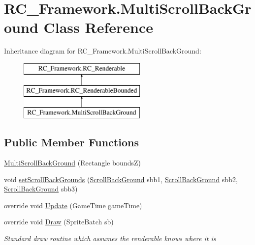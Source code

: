 \hypertarget{class_r_c___framework_1_1_multi_scroll_back_ground}{}\section{R\+C\+\_\+\+Framework.\+Multi\+Scroll\+Back\+Ground Class Reference}
\label{class_r_c___framework_1_1_multi_scroll_back_ground}
Inheritance diagram for R\+C\+\_\+\+Framework.\+Multi\+Scroll\+Back\+Ground\+:\begin{figure}[H]
\begin{center}
\leavevmode
\includegraphics[height=3.000000cm]{class_r_c___framework_1_1_multi_scroll_back_ground}
\end{center}
\end{figure}
\subsection*{Public Member Functions}
\begin{DoxyCompactItemize}
\item 
\mbox{\hyperlink{class_r_c___framework_1_1_multi_scroll_back_ground_a080400ff40d4fb293197930c6a76560e}{Multi\+Scroll\+Back\+Ground}} (Rectangle boundsZ)
\item 
void \mbox{\hyperlink{class_r_c___framework_1_1_multi_scroll_back_ground_a480037cbf0141cd66686b3692f1af978}{set\+Scroll\+Back\+Grounds}} (\mbox{\hyperlink{class_r_c___framework_1_1_scroll_back_ground}{Scroll\+Back\+Ground}} sbb1, \mbox{\hyperlink{class_r_c___framework_1_1_scroll_back_ground}{Scroll\+Back\+Ground}} sbb2, \mbox{\hyperlink{class_r_c___framework_1_1_scroll_back_ground}{Scroll\+Back\+Ground}} sbb3)
\item 
override void \mbox{\hyperlink{class_r_c___framework_1_1_multi_scroll_back_ground_aed0cdef9bd5f161cde89af98dcf63e24}{Update}} (Game\+Time game\+Time)
\item 
override void \mbox{\hyperlink{class_r_c___framework_1_1_multi_scroll_back_ground_ac59e7e1e7a2e1ccfc364883b98765f00}{Draw}} (Sprite\+Batch sb)
\begin{DoxyCompactList}\small\item\em Standard draw routine which assumes the renderable knows where it is \end{DoxyCompactList}\end{DoxyCompactItemize}
